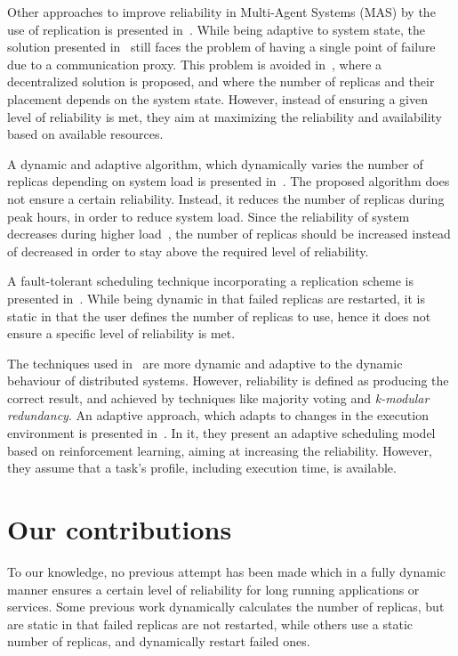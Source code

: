 \documentclass{cslthse-msc}
\begin{document}
Other approaches to improve reliability in Multi-Agent Systems (MAS) by the use of replication is presented in~\cite{replicatingAgents, adaptiveMASReplication, adaptiveAgentReplication}. While being adaptive to system state, the solution presented in~\cite{replicatingAgents} still faces the problem of having a single point of failure due to a communication proxy. This problem is avoided in~\cite{adaptiveMASReplication}, where a decentralized solution is proposed, and where the number of replicas and their placement depends on the system state. However, instead of ensuring a given level of reliability is met, they aim at maximizing the reliability and availability based on available resources. %

A dynamic and adaptive algorithm, which dynamically varies the number of replicas depending on system load is presented in~\cite{adaptiveCheckPointAndRep}. The proposed algorithm does not ensure a certain reliability. Instead, it reduces the number of replicas during peak hours, in order to reduce system load. Since the reliability of system decreases during higher load~\cite{studyOfFailures, implicationsOfFailures}, the number of replicas should be increased instead of decreased in order to stay above the required level of reliability.

A fault-tolerant scheduling technique incorporating a replication scheme is presented in~\cite{faultTolerantSchedPolicy}. While being dynamic in that failed replicas are restarted, it is static in that the user defines the number of replicas to use, hence it does not ensure a specific level of reliability is met.

The techniques used in~\cite{selfAdaptRel, dynAdaptRepl, relModelWebServices} are more dynamic and adaptive to the dynamic behaviour of distributed systems. However, reliability is defined as producing the correct result, and achieved by techniques like majority voting and \emph{k-modular redundancy}. An adaptive approach, which adapts to changes in the execution environment is presented in~\cite{imprRelAdaptRL}. In it, they present an adaptive scheduling model based on reinforcement learning, aiming at increasing the reliability. However, they assume that a task's profile, including execution time, is available.

\section{Our contributions} \label{sec:introduction_contributions}
To our knowledge, no previous attempt has been made which in a fully dynamic manner ensures a certain level of reliability for long running applications or services. Some previous work dynamically calculates the number of replicas, but are static in that failed replicas are not restarted, while others use a static number of replicas, and dynamically restart failed ones.
\end{document}
